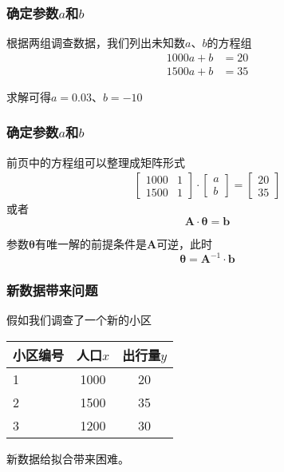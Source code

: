 \documentclass[14pt]{beamer}
\newcommand{\mat}[1]{\bm{#1}}
\renewcommand{\vec}[1]{\bm{#1}}
\begin{document}
\begin{frame}
    \frametitle{确定参数$a$和$b$}
    根据两组调查数据，我们列出未知数$a$、$b$的方程组
    \begin{align*}
        1000a+b&=20\\
        1500a+b&=35
    \end{align*}

    求解可得$a=0.03$、$b=-10$
\end{frame}

\begin{frame}
    \frametitle{确定参数$a$和$b$}
    前页中的方程组可以整理成矩阵形式
    \begin{align*}
        \begin{bmatrix}
            1000 & 1\\
            1500 & 1
        \end{bmatrix}\cdot
        \begin{bmatrix}
            a \\
            b
        \end{bmatrix}=
        \begin{bmatrix}
            20\\
            35
        \end{bmatrix}
    \end{align*}
    或者
    \[\mat{A}\cdot \vec{\theta}=\vec{b}\]

    参数$\vec{\theta}$有唯一解的前提条件是$\mat{A}$可逆，此时
    \[ \vec{\theta}= \mat{A}^{-1}\cdot\vec{b}\]
\end{frame}

\begin{frame}
    \frametitle{新数据带来问题}
    假如我们调查了一个新的小区
    \begin{table}
        \begin{tabular}{l c c}
            小区编号 & 人口$x$ & 出行量$y$ \\
            \hline\hline
            1   & 1000  & 20 \\
            2   & 1500  & 35 \\
            \rowcolor{HRed} 3 & 1200 & 30      
        \end{tabular}
    \end{table}

    新数据给拟合带来困难。
\end{frame}
\end{document}
